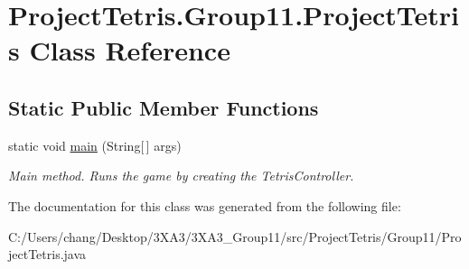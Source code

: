 \hypertarget{class_project_tetris_1_1_group11_1_1_project_tetris}{}\section{Project\+Tetris.\+Group11.\+Project\+Tetris Class Reference}
\label{class_project_tetris_1_1_group11_1_1_project_tetris}
\subsection*{Static Public Member Functions}
\begin{DoxyCompactItemize}
\item 
\hypertarget{class_project_tetris_1_1_group11_1_1_project_tetris_a085a414cec5f52b4e6da31d0a97f2b2b}{}\label{class_project_tetris_1_1_group11_1_1_project_tetris_a085a414cec5f52b4e6da31d0a97f2b2b} 
static void \hyperlink{class_project_tetris_1_1_group11_1_1_project_tetris_a085a414cec5f52b4e6da31d0a97f2b2b}{main} (String\mbox{[}$\,$\mbox{]} args)
\begin{DoxyCompactList}\small\item\em Main method. Runs the game by creating the Tetris\+Controller. \end{DoxyCompactList}\end{DoxyCompactItemize}


The documentation for this class was generated from the following file\+:\begin{DoxyCompactItemize}
\item 
C\+:/\+Users/chang/\+Desktop/3\+X\+A3/3\+X\+A3\+\_\+\+Group11/src/\+Project\+Tetris/\+Group11/Project\+Tetris.\+java\end{DoxyCompactItemize}
